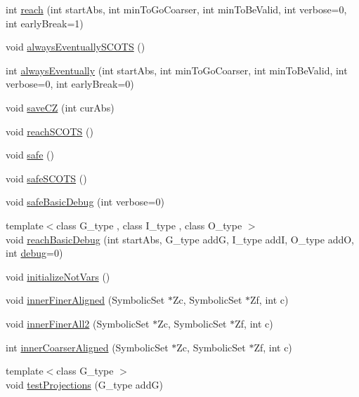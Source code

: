 \begin{DoxyCompactItemize}
\item 
int \hyperlink{classscots_1_1Adaptive_aaa27769c17f2b91743f1e7fc0ff51060}{reach} (int start\+Abs, int min\+To\+Go\+Coarser, int min\+To\+Be\+Valid, int verbose=0, int early\+Break=1)
\item 
void \hyperlink{classscots_1_1Adaptive_a6bdf5b60cd9fb7af657091ad5975743d}{always\+Eventually\+S\+C\+O\+TS} ()
\item 
int \hyperlink{classscots_1_1Adaptive_a7823d9e433b00b740e56d0eabb920f7b}{always\+Eventually} (int start\+Abs, int min\+To\+Go\+Coarser, int min\+To\+Be\+Valid, int verbose=0, int early\+Break=0)
\item 
void \hyperlink{classscots_1_1Adaptive_ad3b8d9cf97cd0967409c14361a40d779}{save\+CZ} (int cur\+Abs)
\item 
void \hyperlink{classscots_1_1Adaptive_ad583956ec022b6bd00a62680ff38103a}{reach\+S\+C\+O\+TS} ()
\item 
void \hyperlink{classscots_1_1Adaptive_a76d026d45bd794eba3ef69c18835dd54}{safe} ()
\item 
void \hyperlink{classscots_1_1Adaptive_afd80e725160ae143493105b2fe99fe02}{safe\+S\+C\+O\+TS} ()
\item 
void \hyperlink{classscots_1_1Adaptive_a1c7b5c07621e61b846b70e949b92b0b7}{safe\+Basic\+Debug} (int verbose=0)
\item 
{\footnotesize template$<$class G\+\_\+type , class I\+\_\+type , class O\+\_\+type $>$ }\\void \hyperlink{classscots_1_1Adaptive_ae1663a6a4ab0ffe2025f954be4fe4116}{reach\+Basic\+Debug} (int start\+Abs, G\+\_\+type addG, I\+\_\+type addI, O\+\_\+type addO, int \hyperlink{classscots_1_1Adaptive_a8ea5724cde577baf708496d6bef7e548}{debug}=0)
\item 
void \hyperlink{classscots_1_1Adaptive_a6a9af6f25e8c4015ceb24d704da26972}{initialize\+Not\+Vars} ()
\item 
void \hyperlink{classscots_1_1Adaptive_af4c5423a62b8c11110d0a2bdcc96d4fb}{inner\+Finer\+Aligned} (Symbolic\+Set $\ast$Zc, Symbolic\+Set $\ast$Zf, int c)
\item 
void \hyperlink{classscots_1_1Adaptive_a4054eda5087611f78dddb2c378fcbb6e}{inner\+Finer\+All2} (Symbolic\+Set $\ast$Zc, Symbolic\+Set $\ast$Zf, int c)
\item 
int \hyperlink{classscots_1_1Adaptive_a01f8f69d290f9c81f76f6ab44d9ef193}{inner\+Coarser\+Aligned} (Symbolic\+Set $\ast$Zc, Symbolic\+Set $\ast$Zf, int c)
\item 
{\footnotesize template$<$class G\+\_\+type $>$ }\\void \hyperlink{classscots_1_1Adaptive_aa4f1995704cf927fff530e715a6214ec}{test\+Projections} (G\+\_\+type addG)

\end{DoxyCompactItemize}
